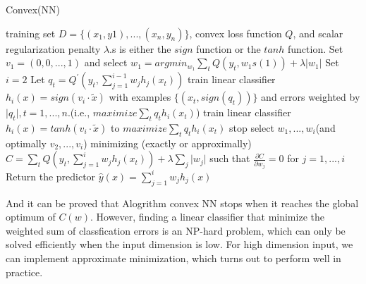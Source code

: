 \documentclass{article}
\begin{document}
\begin{algorithm}[htb]
\caption{Convex(NN)}
\begin{algorithmic}[1]
\REQUIRE
training set $D = \{ (x_{1},y{1}),...,(x_{n},y_{n})\}$, convex loss function $Q$, and scalar regularization penalty $\lambda$.s is either the $sign$ function or the $tanh$ function.
\STATE Set $v_{1} = (0,0,...,1)$ and select $w_{1} = argmin_{w_{1}} \sum_{t} Q(y_{t},w_{1}s(1))+\lambda \lvert w_{1} \rvert$
\STATE Set $i = 2$
  \STATE Let $q_{t} = Q^{'}(y_{t},\sum_{j=1}^{i-1} w_{j}h_{j}(x_t))$
    \STATE train linear classifier $h_{i}(x) = sign(v_{i}\cdot \tilde{x})$ with examples $\{(x_{t}, sign(q_{t}))\}$ and errors weighted by $\lvert q_{t} \rvert, t=1,...,n$.(i.e., $maximize \sum_{t} q_{t}h_{i}(x_{t})$)
    \STATE train linear classifier $h_{i}(x) = tanh(v_{i}\cdot \tilde{x})$ to $maximize \sum_{t} q_{t}h_{i}(x_{t})$
  \ENDIF
    \STATE stop
  \ENDIF
  \STATE select $w_{1},...,w_{i}$(and optimally $v_{2},...,v_{i}$) minimizing (exactly or approximally) $C = \sum_{t}Q(y_{t},\sum_{j=1}^{i} w_{j}h_{j}(x_{t})) + \lambda \sum_{j}\lvert w_{j} \rvert$ such that 
$\frac{\partial C}{\partial w_{j}} = 0$ for $j=1,...,i$
  \STATE Return the predictor $\hat{y}(x) = \sum_{j=1}^{i} w_{j}h_{j}(x)$
\ENDWHILE
\end{algorithmic}
\end{algorithm}

And it can be proved that Alogrithm convex NN stops when it reaches the global optimum of $C(w)$. However, finding a linear classifier that minimize the weighted sum of classfication errors is an NP-hard problem, which can only be solved  efficiently when the input dimension is low. For high dimension input, we can implement approximate minimization, which turns out to perform well in practice.
\end{document}
